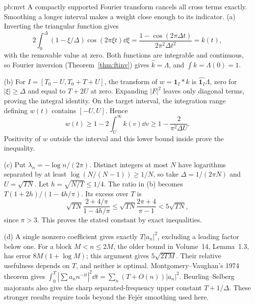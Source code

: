 \begin{solution}{pb:mvt}
\idea A compactly supported Fourier transform cancels all cross terms exactly. Smoothing a longer interval makes a weight close enough to its indicator.
\writeup (a) Inverting the triangular function gives
\[2\int_0^\Delta(1-\xi/\Delta)\cos(2\pi\xi t)\dd\xi
 =\frac{1-\cos(2\pi\Delta t)}{2\pi^2\Delta t^2}=k(t),
\]
with the removable value at zero. Both functions are integrable and continuous, so Fourier inversion (Theorem~\ref{thm:ftinv}) gives $\hat k=\Lambda$, and $\int k=\Lambda(0)=1$.

(b) For $I=[T_0-U,T_0+T+U]$, the transform of $w=\mathbf1_I*k$ is $\widehat{\mathbf1_I}\Lambda$, zero for $|\xi|\ge\Delta$ and equal to $T+2U$ at zero. Expanding $|F|^2$ leaves only diagonal terms, proving the integral identity. On the target interval, the integration range defining $w(t)$ contains $[-U,U]$. Hence
\[w(t)\ge1-2\int_U^\infty k(v)\dd v\ge1-\frac2{\pi^2\Delta U}.
\]
Positivity of $w$ outside the interval and this lower bound inside prove the inequality.

(c) Put $\lambda_n=-\log n/(2\pi)$. Distinct integers at most $N$ have logarithms separated by at least $\log(N/(N-1))\ge1/N$, so take $\Delta=1/(2\pi N)$ and $U=\sqrt{TN}$. Let $h=\sqrt{N/T}\le1/4$. The ratio in (b) becomes $T(1+2h)/(1-4h/\pi)$. Its excess over $T$ is
\[\sqrt{TN}\frac{2+4/\pi}{1-4h/\pi}
 \le\sqrt{TN}\frac{2\pi+4}{\pi-1}<5\sqrt{TN},
\]
since $\pi>3$. This proves the stated constant by exact inequalities.

(d) A single nonzero coefficient gives exactly $T|a_n|^2$, excluding a leading factor below one. For a block $M<n\le2M$, the older bound in Volume~14, Lemma~1.3, has error $8M(1+\log M)$; this argument gives $5\sqrt{2TM}$. Their relative usefulness depends on $T$, and neither is optimal.
\leads Montgomery--Vaughan's 1974 theorem gives $\int_0^T|\sum a_nn^{-it}|^2\dd t=\sum_n(T+O(n))|a_n|^2$. Beurling--Selberg majorants also give the sharp separated-frequency upper constant $T+1/\Delta$. These stronger results require tools beyond the Fej\'er smoothing used here.
\end{solution}

